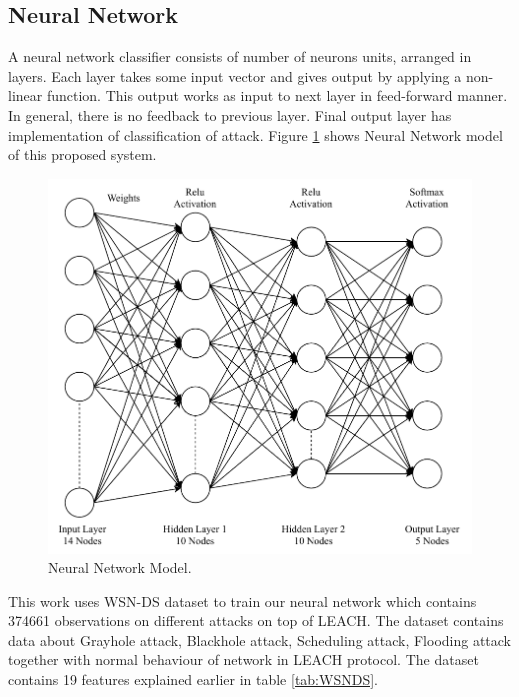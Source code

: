     \subsection{Neural Network} \label{SSNN}
    A neural network classifier consists of number of neurons units, arranged in layers. Each layer takes some input vector and gives output by applying a non-linear function. This output works as input to next layer in feed-forward manner. In general, there is no feedback to previous layer. Final output layer has implementation of classification of attack. Figure \ref{NN} shows Neural Network model of this proposed system.
    \begin{figure}[h]
    \center	
    \includegraphics[scale=0.9]{Figures/PDF/NN.pdf}	
    \caption{Neural Network Model.}
    \label{NN}	
    \end{figure}
    
    \par This work uses WSN-DS dataset to train our neural network which contains 374661 observations on different attacks on top of LEACH. The dataset contains data about Grayhole attack, Blackhole attack, Scheduling attack, Flooding attack together with normal behaviour of network in LEACH protocol. The dataset contains 19 features explained earlier in table \ref{tab:WSNDS}.
